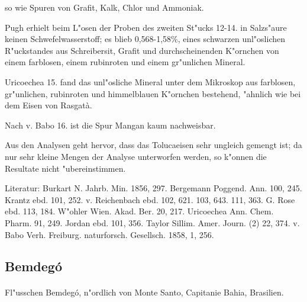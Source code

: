 \documentclass[a4paper, 11pt, oneside]{article}
\begin{document}
so wie Spuren von Grafit, Kalk, Chlor und Ammoniak.

Pugh erhielt beim L"osen der Proben des zweiten St"ucks 12-14. in Salzs"aure keinen Schwefelwasserstoff; es blieb 0,568-1,58\%, eines schwarzen unl"oslichen R"uckstandes aus Schreibersit, Grafit und durchscheinenden K"ornchen von einem farblosen, einem rubinroten und einem gr"unlichen Mineral.

Uricoechea 15. fand das unl"osliche Mineral unter dem Mikroskop aus farblosen, gr"unlichen, rubinroten und himmelblauen K"ornchen bestehend, "ahnlich wie bei dem Eisen von Rasgatà.

Nach v. Babo 16. ist die Spur Mangan kaum nachweisbar.

Aus den Analysen geht hervor, dass das Tolucaeisen sehr ungleich gemengt ist; da nur sehr kleine Mengen der Analyse unterworfen werden, so k"onnen die Resultate nicht "ubereinstimmen.

\footnotesize
Literatur: Burkart N. Jahrb. Min. 1856, 297. Bergemann Poggend. Ann. 100, 245. Krantz ebd. 101, 252. v. Reichenbach ebd. 102, 621. 103, 643. 111, 363. G. Rose ebd. 113, 184. W"ohler Wien. Akad. Ber. 20, 217. Uricoechea Ann. Chem. Pharm. 91, 249. Jordan ebd. 101, 356. Taylor Sillim. Amer. Journ. (2) 22, 374. v. Babo Verh. Freiburg. naturforsch. Gesellsch. 1858, 1, 256.

\subsection{Bemdegó}
\normalsize
\paragraph{}
Fl"usschen Bemdegó, n"ordlich von Monte Santo, Capitanie Bahia, Brasilien.
\end{document}
